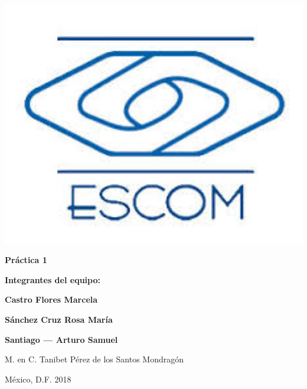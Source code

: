 \begin{minipage}{0.20\textwidth}
\includegraphics[width=1\textwidth]{portada/escom.jpg}

\end{minipage}%

\vspace{3cm}
\centerline{\Large \bf Práctica 1}


\vspace{2cm}
\centerline{\Large  \bf Integrantes del equipo:}
\vspace{1cm}
\centerline{\Large  \bf Castro Flores Marcela}
\vspace{.2cm}
\centerline{\Large  \bf Sánchez Cruz Rosa María}
\vspace{.2cm}
\centerline{\Large  \bf Santiago --- Arturo Samuel}

\vspace{2cm}

\centerline{\Large  M. en C. Tanibet Pérez de los Santos Mondragón }
 
\vspace{2cm}
{\large  M\'{e}xico, D.F. \hfill 2018}
